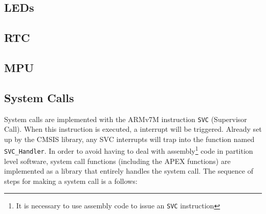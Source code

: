 \subsection{LEDs}

\subsection{RTC}

\subsection{MPU}

\subsection{System Calls}
System calls are implemented with the ARMv7M instruction \texttt{SVC} (Supervisor
Call). When this instruction is executed, a interrupt will be triggered. Already
set up by the CMSIS library, any SVC interrupts will trap into the function
named \texttt{SVC\_Handler}.
In order to avoid having to deal with assembly\footnote{It is necessary to use
assembly code to issue an \texttt{SVC} instruction} code in partition level
software, system call functions (including the APEX functions) are implemented
as a library that entirely handles the system call.
The sequence of steps for making a system call is a follows:\\
